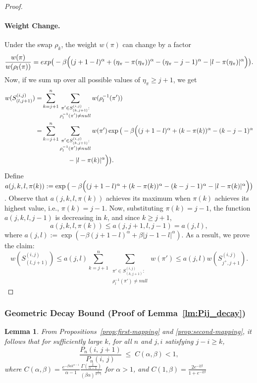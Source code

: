 \documentclass{article}
\newtheorem{lemma}[theorem]{Lemma}     %
\begin{document}
\begin{proof}
 \paragraph{Weight Change.}  
 Under the swap $\rho_k$, the weight $w(\pi)$ can change by a factor 
\[
   \frac{w(\pi)}{w(\rho_l(\pi))}=exp\big(-\beta\Bigl((j+1-l)^\alpha+(\eta_\pi-\pi(\eta_\pi))^\alpha-(\eta_\pi-j-1)^\alpha-
   |l-\pi(\eta_\pi)|^\alpha\Bigr)\big).
\]
Now, if we sum up over all possible values of $\eta_\pi\geq j+1$, we get
    \begin{align*}
        w(S^{(i,j)}_{(l,j+1)}) =& \sum_{k=j+1}^n 
        \sum_{\substack{\pi'\in S^{(i,j)}_{(k,j+1)}:\\ \rho_l^{-1}(\pi')\neq null}}
        w(\rho_l^{-1}(\pi'))\\
        =& \sum_{k=j+1}^n 
        \sum_{\substack{\pi'\in S^{(i,j)}_{(k,j+1)}:\\ \rho_l^{-1}(\pi')\neq null}}w(\pi')\exp\big(-\beta\Bigl((j+1-l)^\alpha+(k-\pi(k))^\alpha-(k-j-1)^\alpha\\
        &\qquad\qquad-
   |l-\pi(k)|^\alpha\Bigr)\big).
    \end{align*}
    Define $a(j,k,l,\pi(k)):=\exp\big(-\beta\Bigl((j+1-l)^\alpha+(k-\pi(k))^\alpha-(k-j-1)^\alpha-
   |l-\pi(k)|^\alpha\Bigr)\big)$.
Observe that $a(j,k,l,\pi(k))$  achieves its maximum when $\pi(k)$ achieves its highest value, i.e., $\pi(k)=j-1$. Now, substituting $\pi(k)=j-1$, the function $a(j,k,l,j-1)$ is decreasing in $k$, and since $k\ge j+1$,
\begin{equation}
    a(j,k,l,\pi(k)) \le a(j,j+1,l,j-1) = a(j,l),
\end{equation}
where $a(j,l):= \exp\left(
        -\beta(j+1-l)^\alpha
        +\beta|j-1-l|^\alpha\right)$.
  As a result, we prove the claim: \[  w(S^{(i,j)}_{(l,j+1)})\leq a(j,l)  \sum_{k=j+1}^n 
        \sum_{\substack{\pi'\in S^{(i,j)}_{(k,j+1)}:\\ \rho_l^{-1}(\pi')\neq null}}w(\pi')\leq a(j,l) w(S^{(i,j)}_{j^+,j+1}).\] 
 \end{proof}
\subsubsection{Geometric Decay Bound (Proof of Lemma~\ref{lm:Pij_decay})}\label{app:proof pij}
\begin{lemma}
\label{lm:Pij_decay_restate}
From Propositions~\ref{prop:first-mapping} and \ref{prop:second-mapping}, it follows that for sufficiently large $k$, for all $n$  and $j,i$ satisfying $j - i\geq k$, 
\[
\frac{P_n(i,\,j+1)}{P_n(i,\,j)} 
  \;\leq\;
  C(\alpha,\beta) < 1,
\] where $C(\alpha,\beta)=\frac{e^{-\beta\alpha k^{\alpha-1}}}{\alpha - 1} \frac{\Gamma\left(\frac{1}{\alpha - 1}\right)}{(\beta \alpha)^{\frac{1}{\alpha - 1}}}$  for $\alpha>1$, and $C(1,\beta)  = \frac{2e^{-2\beta}}{1+e^{-2\beta}}$
\end{lemma}
\end{document}
